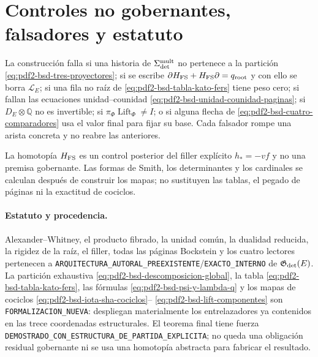 \section{Controles no gobernantes, falsadores y estatuto}

\begin{falsifier}
La construcción falla si una historia de
$\Sigma_{\rm det}^{\rm mult}$ no pertenece a la partición
\eqref{eq:pdf2-bsd-tres-proyectores}; si se escribe
$\partial H_{\rm FS}+H_{\rm FS}\partial=q_{\rm root}$ y con ello se borra
$\mathcal L_E$; si una fila no raíz de
\eqref{eq:pdf2-bsd-tabla-kato-fers} tiene peso cero; si fallan las ecuaciones
unidad--counidad \eqref{eq:pdf2-bsd-unidad-counidad-paginas}; si
$D_E\otimes\mathbb Q$ no es invertible; si
$\pi_\Phi\operatorname{Lift}_\Phi\ne I$; o si alguna flecha de
\eqref{eq:pdf2-bsd-cuatro-comparadores} usa el valor final para fijar su
base. Cada falsador rompe una arista concreta y no reabre las anteriores.
\end{falsifier}

La homotopía $H_{\rm FS}$ es un control posterior del filler explícito
$h_*=-vf$ y no una premisa gobernante. Las formas de Smith, los
determinantes y los cardinales se calculan después de construir los mapas;
no sustituyen las tablas, el pegado de páginas ni la exactitud de cociclos.

\paragraph{Estatuto y procedencia.}
Alexander--Whitney, el producto fibrado, la unidad común, la dualidad
reducida, la rigidez de la raíz, el filler, todas las páginas Bockstein y
los cuatro lectores pertenecen a
\texttt{ARQUITECTURA\_AUTORAL\_PREEXISTENTE}/\texttt{EXACTO\_INTERNO} de
$\mathfrak G_{\rm det}(E)$. La partición exhaustiva
\eqref{eq:pdf2-bsd-descomposicion-global}, la tabla
\eqref{eq:pdf2-bsd-tabla-kato-fers}, las fórmulas
\eqref{eq:pdf2-bsd-psi-y-lambda-q} y los mapas de cociclos
\eqref{eq:pdf2-bsd-iota-sha-cociclos}--
\eqref{eq:pdf2-bsd-lift-componentes} son
\texttt{FORMALIZACION\_NUEVA}: despliegan materialmente los entrelazadores
ya contenidos en las trece coordenadas estructurales. El teorema final tiene
fuerza
\texttt{DEMOSTRADO\_CON\_ESTRUCTURA\_DE\_PARTIDA\_EXPLICITA}; no queda una
obligación residual gobernante ni se usa una homotopía abstracta para
fabricar el resultado.
